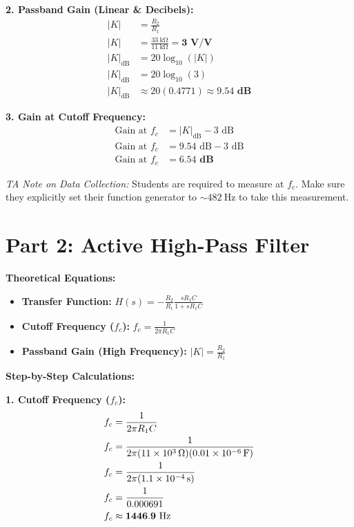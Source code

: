 \documentclass[11pt]{article}
\begin{document}
\textbf{2. Passband Gain (Linear \& Decibels):}
\begin{align*}
  |K| &= \frac{R_2}{R_1} \\
  |K| &= \frac{\SI{33}{\kilo\ohm}}{\SI{11}{\kilo\ohm}} = \mathbf{3 \text{ V/V}} \\[1ex]
  |K|_{\text{dB}} &= 20 \log_{10}(|K|) \\
  |K|_{\text{dB}} &= 20 \log_{10}(3) \\
  |K|_{\text{dB}} &\approx 20 (0.4771) \approx \mathbf{9.54 \text{ dB}}
\end{align*}

\textbf{3. Gain at Cutoff Frequency:}
\begin{align*}
  \text{Gain at } f_c &= |K|_{\text{dB}} - 3\text{ dB} \\
  \text{Gain at } f_c &= 9.54\text{ dB} - 3\text{ dB} \\
  \text{Gain at } f_c &= \mathbf{6.54 \text{ dB}}
\end{align*}

\textit{TA Note on Data Collection:} Students are required to measure at $f_c$. Make sure they explicitly set their function generator to $\sim \SI{482}{\hertz}$ to take this measurement.

\vspace{0.2in}
\section*{Part 2: Active High-Pass Filter}

\textbf{Theoretical Equations:}
\begin{itemize}
  \item \textbf{Transfer Function:} $H(s) = -\frac{R_2}{R_1} \frac{sR_1C}{1 + sR_1C}$
  \item \textbf{Cutoff Frequency ($f_c$):} $f_c = \frac{1}{2\pi R_1 C}$
  \item \textbf{Passband Gain (High Frequency):} $|K| = \frac{R_2}{R_1}$
\end{itemize}

\textbf{Step-by-Step Calculations:}

\textbf{1. Cutoff Frequency ($f_c$):}
\begin{align*}
  f_c &= \frac{1}{2\pi R_1 C} \\
  f_c &= \frac{1}{2\pi (\SI{11e3}{\ohm})(\SI{0.01e-6}{\farad})} \\
  f_c &= \frac{1}{2\pi (\SI{1.1e-4}{\second})} \\
  f_c &= \frac{1}{0.000691} \\
  f_c &\approx \mathbf{1446.9 \text{ \si{\hertz}}}
\end{align*}
\end{document}
